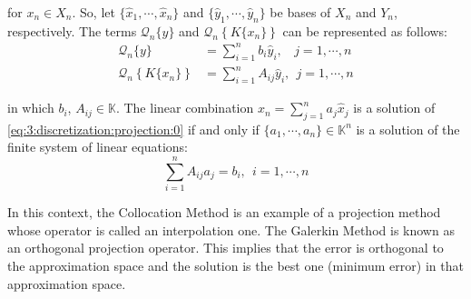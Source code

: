 			\noindent for $x_n\in X_n$. So, let $\{\hat{x}_1,\cdots,\hat{x}_n\}$ and $\{\hat{y}_1,\cdots,\hat{y}_n\}$ be bases of $X_n$ and $Y_n$, respectively. The terms $\mathcal{Q}_n\{y\}$ and  $\mathcal{Q}_n\left\{ K\{x_n\}\right\}$ can be represented as follows:
			\begin{align}
				\mathcal{Q}_n\{y\} &= \sum\limits_{i=1}^n b_i\hat{y}_i, ~~~~j=1,\cdots,n \label{eq:3:discretization:projection:1} \\
				\mathcal{Q}_n\left\{ K\{x_n\}\right\} &= \sum\limits_{i=1}^n A_{ij}\hat{y}_i, ~~j=1,\cdots,n \label{eq:3:discretization:projection:2}
			\end{align}
		
			\noindent in which $b_{i}$, $A_{ij}\in\mathbb{K}$. The linear combination $x_n = \sum_{j=1}^n a_j\hat{x}_j$ is a solution of \eqref{eq:3:discretization:projection:0} if and only if $\{a_1,\cdots,a_n\} \in \mathbb{K}^n$ is a solution of the finite system of linear equations:
			\begin{equation}
				\sum\limits_{i=1}^n A_{ij} a_j = b_i, ~~ i=1,\cdots,n \label{eq:3:discretization:projection:3}
			\end{equation}
			
			In this context, the Collocation Method is an example of a projection method whose operator is called an interpolation one. The Galerkin Method is known as an orthogonal projection operator. This implies that the error is orthogonal to the approximation space and the solution is the best one (minimum error) in that approximation space.
			

